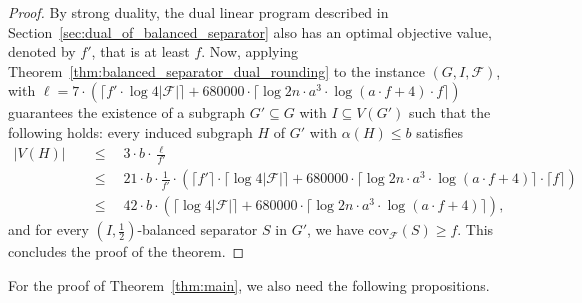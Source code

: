 \documentclass[11pt]{amsart}
\begin{document}
\begin{proof}
    By strong duality, the dual linear program described in Section~\ref{sec:dual_of_balanced_separator} also has an optimal objective value, denoted by $f'$, that is at least $f$. Now, applying Theorem~\ref{thm:balanced_separator_dual_rounding} to the instance $(G, I, \mathcal{F})$, with $\ell = 7 \cdot (\lceil f' \cdot \log 4|\mathcal{F}|\rceil + 680000 \cdot \lceil \log 2n \cdot a^3 \cdot {\log(a\cdot f + 4)} \cdot f \rceil)$ guarantees the existence of a subgraph $G' \subseteq G$ with $I \subseteq V(G')$ such that the following holds: every induced subgraph $H$ of $G'$ with $\alpha(H) \leq b$ satisfies
    \begin{align*}
    |V(H)| \quad
    &\leq\quad 3 \cdot b \cdot \frac{\ell}{f'} \\
    &\leq\quad {21} \cdot b \cdot \frac{1}{f'}\cdot (\lceil f' \rceil\cdot \lceil \log 4|\mathcal{F}| \rceil + 680000 \cdot \lceil \log 2n \cdot a^3 \cdot {\log(a\cdot f + 4)} \rceil\cdot \lceil f \rceil)\\
    &\leq\quad {42} \cdot b \cdot (\lceil \log 4|\mathcal{F}| \rceil + 680000 \cdot \lceil \log 2n \cdot a^3 \cdot {\log(a\cdot f + 4)} \rceil),
    \end{align*}
    and for every $(I, \frac{1}{2})$-balanced separator $S$ in $G'$, we have $\mathrm{cov}_{\mathcal{F}}(S) \geq f$. This concludes the proof of the theorem.
    
\end{proof}

For the proof of Theorem~\ref{thm:main}, we also need the following propositions. 
\end{document}

